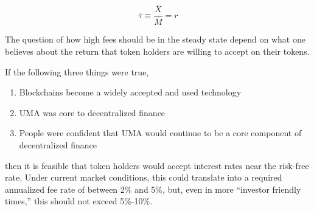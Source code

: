 $$\bar{\tau} \equiv \frac{\bar{X}}{\bar{M}} = r$$

The question of how high fees should be in the steady state depend on what one believes about the
return that token holders are willing to accept on their tokens.

If the following three things were true,

\begin{enumerate}
  \item Blockchains become a widely accepted and used technology
  \item UMA was core to decentralized finance
  \item People were confident that UMA would continue to be a core component of decentralized finance
\end{enumerate}

then it is feasible that token holders would accept interest rates near the risk-free rate. Under
current market conditions, this could translate into a required annualized fee rate of between 2\%
and 5\%, but, even in more ``investor friendly times,'' this should not exceed 5\%-10\%.
